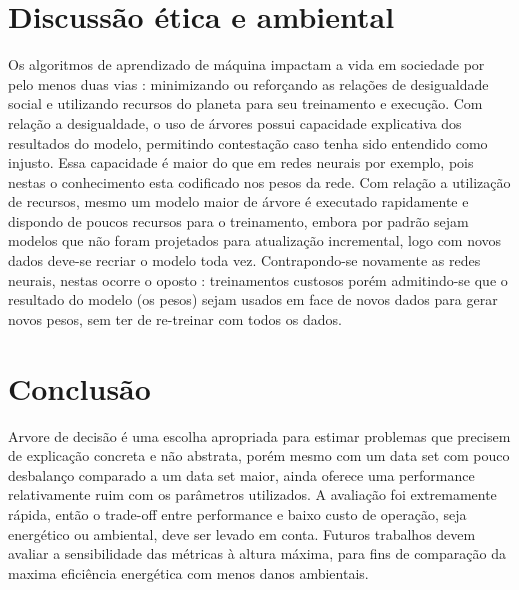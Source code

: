 \documentclass[12pt]{article}
\begin{document}
\section{Discussão ética e ambiental}
Os algoritmos de aprendizado de máquina impactam a vida em sociedade por pelo menos duas vias : minimizando ou reforçando as relações de desigualdade social e utilizando recursos do planeta para seu treinamento e execução. Com relação a desigualdade, o uso de árvores possui capacidade explicativa dos resultados do modelo, permitindo contestação caso tenha sido entendido como injusto. Essa capacidade é maior do que em redes neurais por exemplo, pois nestas o conhecimento esta codificado nos pesos da rede. Com relação a utilização de recursos, mesmo um modelo maior de árvore é executado rapidamente e dispondo de poucos recursos para o treinamento, embora por padrão sejam modelos que não foram projetados para atualização incremental, logo com novos dados deve-se recriar o modelo toda vez. Contrapondo-se novamente as redes neurais, nestas ocorre o oposto : treinamentos custosos porém admitindo-se que o resultado do modelo (os pesos) sejam usados em face de novos dados para gerar novos pesos, sem ter de re-treinar com todos os dados.

\section{Conclusão}
Arvore de decisão é uma escolha apropriada para estimar problemas que precisem de explicação concreta e não abstrata, porém mesmo com um data set com pouco desbalanço comparado a um data set maior, ainda oferece uma performance relativamente ruim com os parâmetros utilizados. A avaliação foi extremamente rápida, então o trade-off entre performance e baixo custo de operação, seja energético ou ambiental, deve ser levado em conta. Futuros trabalhos devem avaliar a sensibilidade das métricas à altura máxima, para fins de comparação da maxima eficiência energética com menos danos ambientais.


\end{document}
